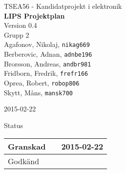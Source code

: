 \documentclass[11pt]{article}
\date{}
\begin{document}
\begin{titlepage}
\begin{center}
TSEA56 - Kandidatprojekt i elektronik \\[0.5in]
{\Large\bfseries LIPS Projektplan}\\
%
\vspace{4\baselineskip}
%
Version 0.4\\
\vspace{2\baselineskip}
%
Grupp 2 \\
Agafonov, Nikolaj, 
\texttt{nikag669}
\\
Berberovic, Adnan, 
\texttt{adnbe196}
\\
Brorsson, Andreas, 
\texttt{andbr981}
\\
Fridborn, Fredrik, 
\texttt{frefr166}
\\
Oprea, Robert, 
\texttt{robop806}
\\
Skytt, Måns, 
\texttt{mansk700}

\vspace{2\baselineskip}
2015-02-22

\vspace{19\baselineskip}
Status
\begin{longtable}{|l|l|l|} \hline

Granskad &
 & 
2015-02-22 \\ \hline
Godkänd &
 &
 \\ \hline
 
\end{longtable}

\end{center}
\end{titlepage}
\end{document}
